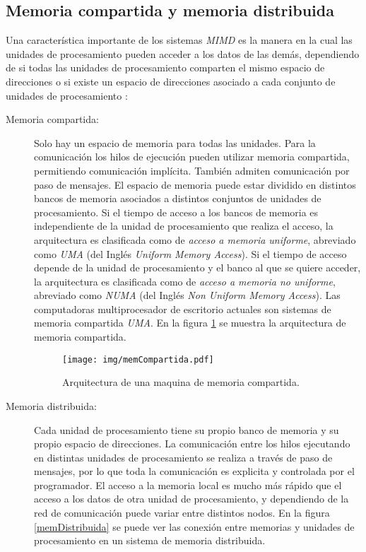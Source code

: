 \subsection{Memoria compartida y memoria distribuida}

Una característica importante de los sistemas \emph{MIMD} es la manera en la
cual las unidades de procesamiento pueden acceder a los datos de las demás,
dependiendo de si todas las unidades de procesamiento comparten el mismo espacio
de direcciones o si existe un espacio de direcciones asociado a cada conjunto de
unidades de procesamiento \cite{introToPC2002, anIntroToPP2011}:

\begin{description}

	\item[Memoria compartida:] Solo hay un espacio de memoria para todas las
		unidades. Para la comunicación los hilos de ejecución pueden
		utilizar memoria compartida, permitiendo comunicación
		implícita. También admiten comunicación por paso de mensajes. El
		espacio de memoria puede estar dividido en distintos bancos de
		memoria asociados a distintos conjuntos de unidades de
		procesamiento. Si el tiempo de acceso a los bancos de memoria es
		independiente de la unidad de procesamiento que realiza el
		acceso, la arquitectura es clasificada como de \emph{acceso a
		memoria uniforme}, abreviado como \emph{UMA} (del Inglés
		\emph{Uniform Memory Access}). Si el tiempo de acceso depende de
		la unidad de procesamiento y el banco al que se quiere acceder,
		la arquitectura es clasificada como de \emph{acceso a memoria no
		uniforme}, abreviado como \emph{NUMA} (del Inglés \emph{Non
		Uniform Memory Access}). Las computadoras multiprocesador de
		escritorio actuales son sistemas de memoria compartida
		\emph{UMA}. En la figura \ref{memCompartida} se muestra la
		arquitectura de memoria compartida.

\begin{figure}[!htb]

	\centering
	\texttt{[image: img/memCompartida.pdf]}
	\caption{Arquitectura de una maquina de memoria compartida.}

	\label{memCompartida}

\end{figure}

	\item[Memoria distribuida:] Cada unidad de procesamiento tiene su propio
		banco de memoria y su propio espacio de direcciones. La
		comunicación entre los hilos ejecutando en distintas unidades de
		procesamiento se realiza a través de paso de mensajes, por lo
		que toda la comunicación es explicita y controlada por el
		programador. El acceso a la memoria local es mucho más rápido
		que el acceso a los datos de otra unidad de procesamiento, y
		dependiendo de la red de comunicación puede variar entre
		distintos nodos. En la figura \ref{memDistribuida} se puede ver
		las conexión entre memorias y unidades de procesamiento en un
		sistema de memoria distribuida.


\end{description}
